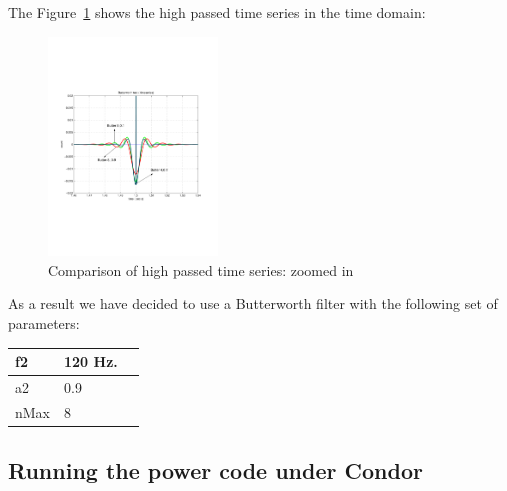 The Figure~\ref{fig:butter894comptimeseries} shows the high passed time series 
in the time domain:
\begin{figure}
\centering
\includegraphics[width=0.4\textwidth]{figures/butter894comptimeseries}
\caption{Comparison of high passed time series: zoomed in} \label{fig:butter894comptimeseries}
\end{figure}

As a result we have decided to use a Butterworth filter with the following 
set of parameters:

\begin{tabular}{|l|l|r|} \hline
  f2  & 120 Hz. \\ \hline
  a2  & 0.9     \\ \hline
  nMax  & 8     \\ \hline
\end{tabular} \label{tab:butterfinal}

\clearpage


\subsection{Running the power code under Condor}
\label{subsection:running_power}


